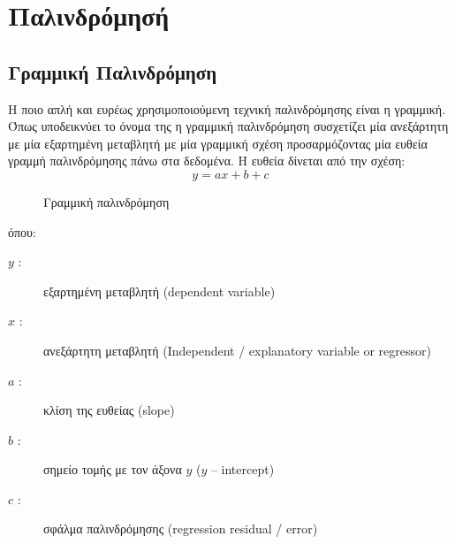 \newpage
\section{Παλινδρόμησή}

\subsection{Γραμμική Παλινδρόμηση}
Η ποιο απλή και ευρέως χρησιμοποιούμενη τεχνική παλινδρόμησης είναι η γραμμική. Όπως
υποδεικνύει το όνομα της η γραμμική παλινδρόμηση συσχετίζει μία ανεξάρτητη με μία
εξαρτημένη μεταβλητή με μία γραμμική σχέση προσαρμόζοντας μία ευθεία γραμμή
παλινδρόμησης πάνω στα δεδομένα. Η ευθεία δίνεται από την σχέση:
$$y=ax+b+c$$
\begin{figure}[H]
    \centering
    \caption{Γραμμική παλινδρόμηση}
\end{figure}
όπου:
\begin{description}
    \item[$y$ :] εξαρτημένη μεταβλητή (\textlatin{dependent variabl}e)
    \item[$x$ :] ανεξάρτητη μεταβλητή (\textlatin{Independent / explanatory variable or regressor})
    \item[$a$ :] κλίση της ευθείας (\textlatin{slope})
    \item[$b$ :] σημείο τομής με τον άξονα $y$ ($y$ – \textlatin{intercept})
    \item[$c$ :] σφάλμα παλινδρόμησης (\textlatin{regression residual / error})
\end{description}

